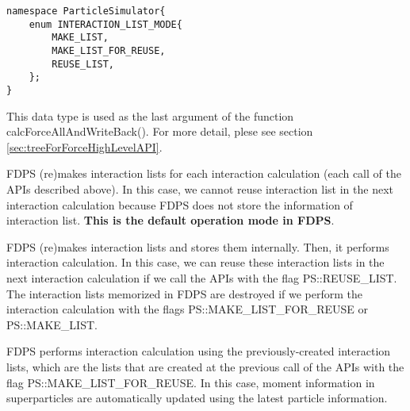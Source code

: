 
\begin{lstlisting}[caption=boundarycondition]
namespace ParticleSimulator{
    enum INTERACTION_LIST_MODE{
        MAKE_LIST,
        MAKE_LIST_FOR_REUSE,
        REUSE_LIST,
    };
}
\end{lstlisting}

This data type is used as the last argument of the function
calcForceAllAndWriteBack(). For more detail, plese see
section \ref{sec:treeForForceHighLevelAPI}.



FDPS (re)makes interaction lists for each interaction calculation
(each call of the APIs described above). In this case, we cannot reuse
interaction list in the next interaction calculation because FDPS does
not store the information of interaction list. \textbf{This is the
default operation mode in FDPS}.




FDPS (re)makes interaction lists and stores them internally. Then, it
performs interaction calculation. In this case, we can reuse these
interaction lists in the next interaction calculation if we call the
APIs with the flag PS::REUSE\_LIST. The interaction lists memorized in
FDPS are destroyed if we perform the interaction calculation with the
flags PS::MAKE\_LIST\_FOR\_REUSE or PS::MAKE\_LIST.\\



FDPS performs interaction calculation using the previously-created
interaction lists, which are the lists that are created at the
previous call of the APIs with the flag PS::MAKE\_LIST\_FOR\_REUSE. In
this case, moment information in superparticles are automatically
updated using the latest particle information.\\

